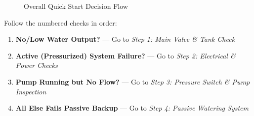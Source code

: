 \documentclass[11pt]{article}
\begin{document}
\begin{figure}[h!]
  \caption{Overall Quick Start Decision Flow}
  \label{fig:flowchart}
\end{figure}

\noindent Follow the numbered checks in order:
\begin{enumerate}[label=\arabic*.]
  \item \textbf{No/Low Water Output?} --- Go to \emph{Step 1: Main Valve \& Tank Check}
  \item \textbf{Active (Pressurized) System Failure?} --- Go to \emph{Step 2: Electrical \& Power Checks}
  \item \textbf{Pump Running but No Flow?} --- Go to \emph{Step 3: Pressure Switch \& Pump Inspection}
  \item \textbf{All Else Fails \textrightarrow Passive Backup} --- Go to \emph{Step 4: Passive Watering System}
\end{enumerate}
\end{document}
